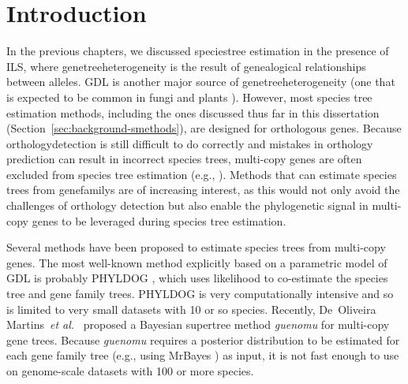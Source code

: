 \section{Introduction}
In the previous chapters, we discussed \gls{speciestree} estimation in the presence of \gls{ILS}, where \gls{genetreeheterogeneity} is the result of genealogical relationships between \glspl{allele}.
\Gls{GDL} is another major source of \gls{genetreeheterogeneity} (one that is expected to be common in fungi \cite{butler2009evolution} and plants \cite{leebensmack2019one}).
However, most species tree estimation methods, including the ones discussed thus far in this dissertation (Section~\ref{sec:background-smethods}), are designed for \gls{orthologous} \glspl{gene}.
Because \gls{orthologydetection} is still difficult to do correctly \cite{quest2014big, lafond2018accurate, altenhoff2019inferring} and mistakes in orthology prediction can result in incorrect species trees, \gls{multi-copy} genes are often excluded from species tree estimation (e.g., \cite{wickett2014phylo, leebensmack2019one}).
Methods that can estimate species trees from \glspl{genefamily} are of increasing interest, as this would not only avoid the challenges of orthology detection but also enable the phylogenetic signal in multi-copy genes to be leveraged during species tree estimation.

Several methods have been proposed to estimate species trees from multi-copy genes.
The most well-known method explicitly based on a parametric model of GDL is probably PHYLDOG \cite{boussau2013genome-phyldog}, which uses likelihood to co-estimate the species tree and gene family trees. 
PHYLDOG is very computationally intensive and so is limited to very small datasets with 10 or so species.
Recently, De~Oliveira Martins~{\em et al.}~\cite{de2016bayesian-guenomu} proposed a Bayesian \gls{supertree} method {\em guenomu} for multi-copy gene trees.
Because {\em guenomu} requires a posterior distribution to be estimated for each gene family tree (e.g., using MrBayes \cite{ronquist2003mrbayes}) as input, it is not fast enough to use on \gls{genome-scale} datasets with 100 or more species.

